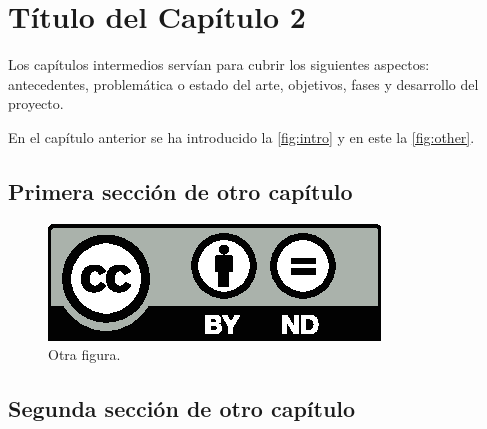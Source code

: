 \chapter{Título del Capítulo 2}
\label{ch:dos}

\noindent Los capítulos intermedios servían para cubrir los siguientes aspectos: antecedentes, problemática o estado del arte, objetivos, fases y desarrollo del proyecto.

En el capítulo anterior se ha introducido la \autoref{fig:intro} y en este la \autoref{fig:other}. 

\section{Primera sección de otro capítulo}
\label{sec:ch2_1}

\begin{figure}[htbp]
   \centering
   \includegraphics[width=0.5\linewidth]{images/licenses/by-nd}
   \caption{Otra figura.}
   \label{fig:other}
\end{figure}

\lipsum[3]

\section{Segunda sección de otro capítulo}

\noindent \lipsum[4-5]


